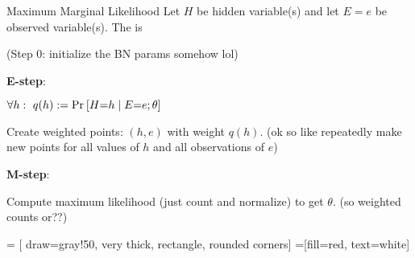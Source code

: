 \documentclass[11pt]{article}
\begin{document}
\begin{definition}{Maximum Marginal Likelihood }
	Let $H$ be hidden variable(s) and let $E=e$ be observed variable(s). The  is
\end{definition}


\begin{algorithm}
	
	(Step 0: initialize the BN params somehow lol)
	
	\textbf{E-step}:
	\begin{compactitem}
		\item $\forall h: ~ q(h) := \text{Pr}_{}\left[H {=} h \mid E {=} e; \theta\right]$
		
		\item Create weighted points: $(h, e)$ with weight $q(h)$. (ok so like repeatedly make new points for all values of $h$ and all observations of $e$)
	\end{compactitem}


	\textbf{M-step}:
	\begin{compactitem}
		\item Compute maximum likelihood (just count and normalize) to get $\theta$. (so weighted counts or??)
	\end{compactitem}


\end{algorithm}

 = [
	draw=gray!50, 
	very thick,
	rectangle, 
	rounded corners]
 =[fill=red, text=white]
\end{document}
